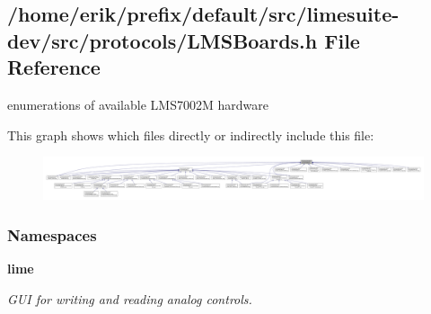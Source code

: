 \subsection{/home/erik/prefix/default/src/limesuite-\/dev/src/protocols/\+L\+M\+S\+Boards.h File Reference}
\label{LMSBoards_8h}


enumerations of available L\+M\+S7002M hardware  


This graph shows which files directly or indirectly include this file\+:
\nopagebreak
\begin{figure}[H]
\begin{center}
\leavevmode
\includegraphics[width=350pt]{d0/d71/LMSBoards_8h__dep__incl}
\end{center}
\end{figure}
\subsubsection*{Namespaces}
\begin{DoxyCompactItemize}
\item 
 {\bf lime}
\begin{DoxyCompactList}\small\item\em G\+UI for writing and reading analog controls. \end{DoxyCompactList}\end{DoxyCompactItemize}
